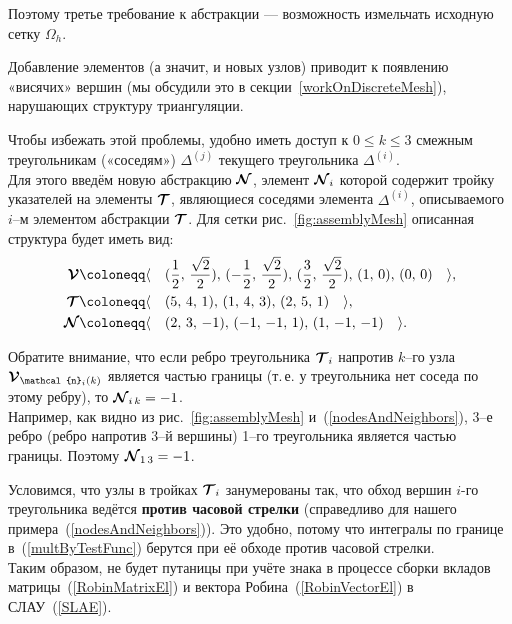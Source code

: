 Поэтому третье требование к абстракции --- возможность измельчать исходную сетку $\Omega_h$.

Добавление элементов (а значит, и новых узлов) приводит к появлению «висячих» вершин (мы обсудили это в секции~\ref{workOnDiscreteMesh}), нарушающих структуру триангуляции.

Чтобы избежать этой проблемы, удобно иметь доступ к $0 \le k \le 3$ смежным треугольникам («соседям») $\Delta^{(j)}$ текущего треугольника $\Delta^{(i)}$.\\ Для этого введём новую абстракцию $\boldsymbol{\mathbf{\mathcal{N}}}$, элемент $\boldsymbol{\mathbf{\mathcal{N}}}_i$ которой содержит тройку указателей на элементы $\boldsymbol{\mathbf{\mathcal{T}}}$, являющиеся соседями элемента $\Delta^{(i)}$, описываемого $i$--м элементом абстракции $\boldsymbol{\mathbf{\mathcal{T}}}$. Для сетки рис.~\ref{fig:assemblyMesh} описанная структура будет иметь вид:
\begin{subequations}
	\label{nodesAndNeighbors}
	\begin{align}
		\vect{\mathcal{V}} &\coloneqq \langle \quad
		( \frac{1}{2}, \, \frac{\sqrt{2}}{2} ), \,
		( -\frac{1}{2}, \, \frac{\sqrt{2}}{2} ), \,
		( \frac{3}{2}, \, \frac{\sqrt{2}}{2} ), \,
		(1, \, 0), \,
		(0, \, 0)
		\quad \rangle, \\
		\vect{\mathcal{T}} &\coloneqq \langle \quad
		( 5, \, 4, \, 1 ), \,
		( 1, \, 4, \, 3 ), \,
		( 2, \, 5, \, 1 )
		\quad \rangle, \\
		\vect{\mathcal{N}} &\coloneqq \langle \quad
		( 2, \, 3, \, -1 ), \,
		( -1, \, -1, \, 1 ), \,
		( 1, \, -1, \, -1 )
		\quad \rangle.
	\end{align}
\end{subequations}

Обратите внимание, что если ребро треугольника $\boldsymbol{\mathbf{\mathcal{T}}}_i$ напротив $k$--го узла $\vect{\mathcal{V}}_{\vect{\mathcal{n}}_i(k)}$ является частью границы (т.\,е. у треугольника нет соседа по этому ребру), то $\boldsymbol{\mathbf{\mathcal{N}}}_{i\,k} = -1$. \\
Например, как видно из рис.~\ref{fig:assemblyMesh} и~(\ref{nodesAndNeighbors}), 3--е ребро (ребро напротив 3--й вершины) 1--го треугольника является частью границы. Поэтому $\boldsymbol{\mathbf{\mathcal{N}}}_{1\,3} = -1$.

Условимся, что узлы в тройках $\boldsymbol{\mathbf{\mathcal{T}}}_{i}$ занумерованы так, что обход вершин $i$-го треугольника ведётся \textbf{против часовой стрелки} (справедливо для нашего примера~(\ref{nodesAndNeighbors})). Это удобно, потому что интегралы по границе в~(\ref{multByTestFunc}) берутся при её обходе против часовой стрелки.\\
Таким образом, не будет путаницы при учёте знака в процессе сборки вкладов матрицы~(\ref{RobinMatrixEl}) и вектора Робина~(\ref{RobinVectorEl}) в СЛАУ~(\ref{SLAE}).

